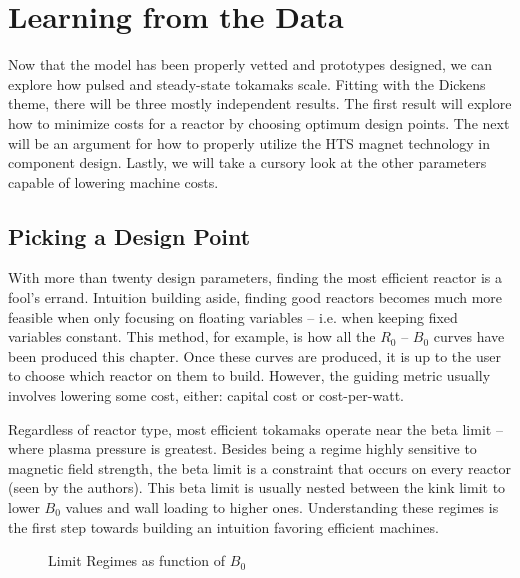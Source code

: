 \begin{table}[h!]
\begin{subtable}[t]{0.5\textwidth}
\begin{tabular}{ c|c }
\end{tabular}
\end{subtable}
\hfill
\hfill
\end{table}

\section{Learning from the Data}

Now that the model has been properly vetted and prototypes designed, we can explore how pulsed and steady-state tokamaks scale. Fitting with the Dickens theme, there will be three mostly independent results. The first result will explore how to minimize costs for a reactor by choosing optimum design points. The next will be an argument for how to properly utilize the HTS magnet technology in component design. Lastly, we will take a cursory look at the other parameters capable of lowering machine costs.

\subsection{Picking a Design Point}

With more than twenty design parameters, finding the most efficient reactor is a fool's errand. Intuition building aside, finding good reactors becomes much more feasible when only focusing on floating variables -- i.e. when keeping fixed variables constant. This method, for example, is how all the $R_0$ -- $B_0$ curves have been produced this chapter. Once these curves are produced, it is up to the user to choose which reactor on them to build. However, the guiding metric usually involves lowering some cost, either: capital cost or cost-per-watt.

Regardless of reactor type, most efficient tokamaks operate near the beta limit -- where plasma pressure is greatest. Besides being a regime highly sensitive to magnetic field strength, the beta limit is a constraint that occurs on every reactor (seen by the authors). This beta limit is usually nested between the kink limit to lower $B_0$ values and wall loading to higher ones. Understanding these regimes is the first step towards building an intuition favoring efficient machines.

\begin{figure}
\centering
\begin{adjustbox}{width=0.75\textwidth}
	
\end{adjustbox}
\caption{Limit Regimes as function of $B_0$}
\end{figure}

